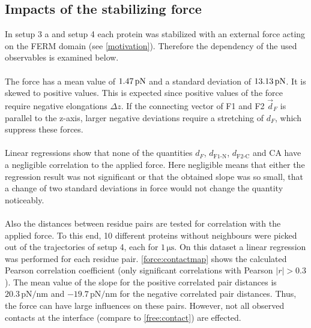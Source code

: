 \subsection{Impacts of the stabilizing force}
In setup 3 a and setup 4 each protein was stabilized with an external force acting on the FERM domain (see \autoref{motivation}). Therefore the dependency of the used observables is examined below.\\
\\
The force has a mean value of $1.47\,\forceunit$ and a standard deviation of $13.13\,\forceunit$. It is skewed to positive values. This is expected since positive values of the force require negative elongations $\Delta z$. If the connecting vector of F1 and F2 $\vec{d}_F$ is parallel to the z-axis, larger negative deviations require a stretching of $d_F$, which suppress these forces. \\
\\
Linear regressions show that none of the quantities $d_F$, $d_\text{F1-N}$, $d_\text{F2-C}$ and CA have a negligible correlation to the applied force. Here negligible means that either the regression result was not significant or that the obtained slope was so small, that a change of two standard deviations in force would not change the quantity noticeably.\\
\\
Also the distances between residue pairs are tested for correlation with the applied force. To this end, 10 different proteins without neighbours were picked out of the trajectories of setup 4, each for $1\,\si{\micro\second}$. On this dataset a linear regression was performed for each residue pair. \autoref{force:contactmap} shows the calculated Pearson correlation coefficient (only significant correlations with Pearson $\left|r\right| > 0.3$). The mean value of the slope for the positive correlated pair distances is $20.3\,\si{\pico\newton/\nano\metre}$ and $-19.7\,\si{\pico\newton/\nano\metre}$ for the negative correlated pair distances. Thus, the force can have large influences on these pairs. However, not all observed contacts at the interface (compare to \autoref{free:contact}) are effected.
%
%
%
